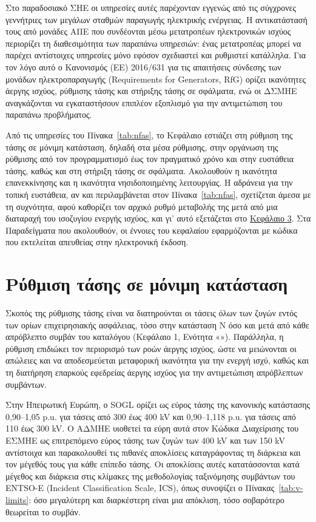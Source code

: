 Στο παραδοσιακό ΣΗΕ οι υπηρεσίες αυτές παρέχονταν εγγενώς από τις σύγχρονες γεννήτριες
των μεγάλων σταθμών παραγωγής ηλεκτρικής ενέργειας. Η αντικατάστασή τους από μονάδες ΑΠΕ που συνδέονται μέσω
μετατροπέων ηλεκτρονικών ισχύος περιορίζει τη διαθεσιμότητα των παραπάνω υπηρεσιών: ένας μετατροπέας μπορεί να παρέχει αντίστοιχες
υπηρεσίες μόνο εφόσον σχεδιαστεί και ρυθμιστεί κατάλληλα. Για τον λόγο αυτό ο Κανονισμός (ΕΕ) 2016/631 για τις απαιτήσεις σύνδεσης
των μονάδων ηλεκτροπαραγωγής (Requirements for Generators, RfG) ορίζει ικανότητες άεργης
ισχύος, ρύθμισης τάσης και στήριξης τάσης σε σφάλματα, ενώ οι ΔΣΜΗΕ αναγκάζονται να εγκαταστήσουν
επιπλέον εξοπλισμό για την αντιμετώπιση του παραπάνω προβλήματος.

Από τις υπηρεσίες του Πίνακα~\ref{tab:nfas}, το Κεφάλαιο εστιάζει στη ρύθμιση της τάσης σε
μόνιμη κατάσταση, δηλαδή στα μέσα ρύθμισης, στην οργάνωση της ρύθμισης από τον προγραμματισμό
έως τον πραγματικό χρόνο και στην ευστάθεια τάσης, καθώς και στη στήριξη τάσης
σε σφάλματα. Ακολουθούν η ικανότητα επανεκκίνησης και η ικανότητα νησιδοποιημένης
λειτουργίας. Η αδράνεια για την τοπική ευστάθεια, αν και περιλαμβάνεται στον Πίνακα~\ref{tab:nfas}, σχετίζεται
άμεσα με τη συχνότητα, αφού καθορίζει τον αρχικό ρυθμό μεταβολής της μετά από μια διαταραχή του
ισοζυγίου ενεργής ισχύος, και γι' αυτό εξετάζεται στο \hyperref[kef-03-theoria]{Κεφάλαιο 3}.
Στα Παραδείγματα που ακολουθούν, οι έννοιες του κεφαλαίου εφαρμόζονται με κώδικα που εκτελείται
απευθείας στην ηλεκτρονική έκδοση.

\section{Ρύθμιση τάσης σε μόνιμη κατάσταση}
\label{sec:v-control}

Σκοπός της ρύθμισης τάσης είναι να διατηρούνται οι τάσεις όλων των ζυγών εντός των ορίων
επιχειρησιακής ασφάλειας, τόσο στην κατάσταση N όσο και μετά από κάθε απρόβλεπτο συμβάν του
καταλόγου (Κεφάλαιο 1, Ενότητα «»). Παράλληλα, η ρύθμιση επιδιώκει τον περιορισμό των ροών άεργης ισχύος, ώστε να
μειώνονται οι απώλειες και να αποδεσμεύεται μεταφορική ικανότητα για την ενεργή ισχύ, καθώς
και τη διατήρηση επαρκούς εφεδρείας άεργης ισχύος για την αντιμετώπιση απρόβλεπτων
συμβάντων.

Στην Ηπειρωτική Ευρώπη, ο SOGL ορίζει ως εύρος τάσης της κανονικής κατάστασης
0,90--1,05 p.u. για τάσεις από 300 έως 400 kV και 0,90--1,118 p.u. για τάσεις από 110 έως
300 kV. Ο ΑΔΜΗΕ υιοθετεί τα εύρη αυτά στον Κώδικα Διαχείρισης του ΕΣΜΗΕ ως επιτρεπόμενο εύρος
τάσης των ζυγών των 400 kV και των 150 kV αντίστοιχα και παρακολουθεί τις πιθανές αποκλίσεις καταγράφοντας τη διάρκεια και τον μέγεθός τους για κάθε επίπεδο τάσης. Οι αποκλίσεις αυτές
κατατάσσονται κατά μέγεθος και διάρκεια στις κλίμακες της μεθοδολογίας ταξινόμησης συμβάντων
του ENTSO-E (Incident Classification Scale, ICS), όπως συνοψίζει ο Πίνακας~\ref{tab:v-limits}:
όσο μεγαλύτερη και διαρκέστερη είναι μια απόκλιση, τόσο σοβαρότερο θεωρείται το συμβάν.

